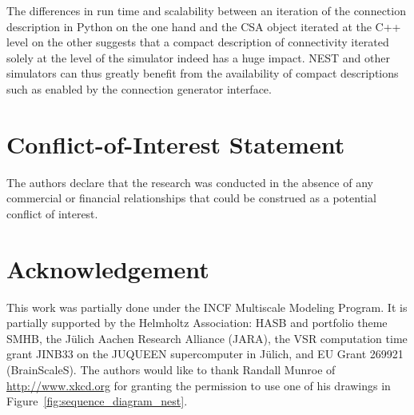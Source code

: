 \documentclass{frontiersSCNS} %
\begin{document}
The differences in run time and scalability between an iteration of
the connection description in Python on the one hand and the CSA
object iterated at the C++ level on the other suggests that a compact
description of connectivity iterated solely at the level of the
simulator indeed has a huge impact. NEST and other simulators can thus
greatly benefit from the availability of compact descriptions such as
enabled by the connection generator interface.


\section*{Conflict-of-Interest Statement}
The authors declare that the research was conducted in the absence of
any commercial or financial relationships that could be construed as a
potential conflict of interest.

\section*{Acknowledgement}
This work was partially done under the INCF Multiscale Modeling
Program. It is partially supported by the Helmholtz Association: HASB
and portfolio theme SMHB, the Jülich Aachen Research Alliance (JARA),
the VSR computation time grant JINB33 on the JUQUEEN supercomputer in
Jülich, and EU Grant 269921 (BrainScaleS). The authors would like to
thank Randall Munroe of \url{http://www.xkcd.org} for granting the
permission to use one of his drawings in
Figure~\ref{fig:sequence_diagram_nest}.



\end{document}
